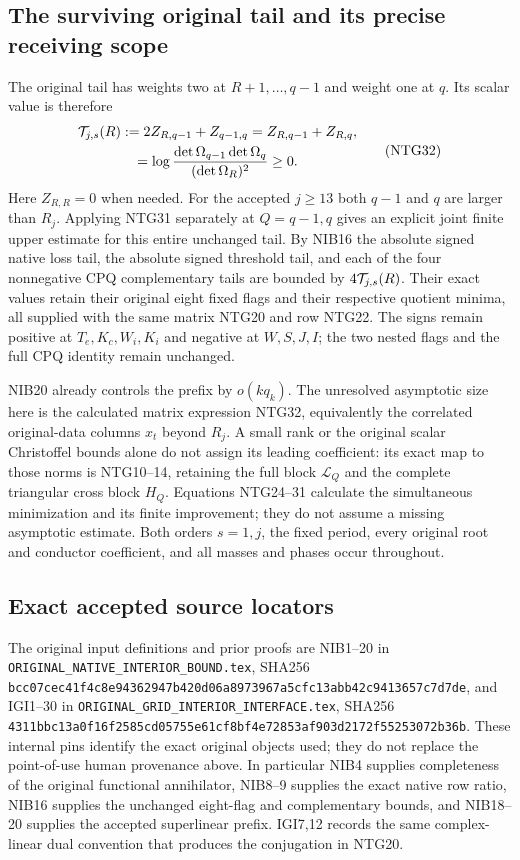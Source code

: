 \subsection{The surviving original tail and its precise receiving scope}
The original tail has weights two at $R+1,\ldots,q-1$
and weight one at $q$. Its scalar value is therefore
\[
\begin{gathered}
 {\cal T}_{j,s}(R)
   :=2Z_{R,q-1}+Z_{q-1,q}
    =Z_{R,q-1}+Z_{R,q},\\
 =\log\frac{\det\Omega_{q-1}\det\Omega_q}
                         {(\det\Omega_R)^2}\ge0 .
\end{gathered}                                                    \tag{NTG32}
\]
Here $Z_{R,R}=0$ when needed. For the accepted $j\ge13$
both $q-1$ and $q$ are larger than $R_j$.
Applying NTG31 separately at $Q=q-1,q$ gives an
explicit joint finite upper estimate for this entire
unchanged tail. By NIB16 the absolute signed native
loss tail, the absolute signed threshold tail, and
each of the four nonnegative CPQ complementary tails
are bounded by $4{\cal T}_{j,s}(R)$.
Their exact values retain their original eight fixed
flags and their respective quotient minima, all
supplied with the same matrix NTG20 and row NTG22.
The signs remain positive at $T_e,K_c,W_i,K_i$ and
negative at $W,S,J,I$; the two nested flags and
the full CPQ identity remain unchanged.

NIB20 already controls the prefix by $o(kq_k)$.
The unresolved asymptotic size here is the calculated
matrix expression NTG32, equivalently the correlated
original-data columns $x_t$ beyond $R_j$. A small rank
or the original scalar Christoffel bounds alone do
not assign its leading coefficient: its exact map
to those norms is NTG10--14, retaining the full block
$\mathcal L_Q$ and the complete triangular cross block $H_Q$.
Equations NTG24--31 calculate the simultaneous
minimization and its finite improvement; they do
not assume a missing asymptotic estimate. Both
orders $s=1,j$, the fixed period, every original
root and conductor coefficient, and all masses
and phases occur throughout.

\subsection{Exact accepted source locators}
The original input definitions and prior proofs are NIB1--20
in \texttt{ORIGINAL\_NATIVE\_INTERIOR\_BOUND.tex},
SHA256
\texttt{bcc07cec41f4c8e94362947b420d06a8973967a5cfc13abb42c9413657c7d7de},
and IGI1--30 in
\texttt{ORIGINAL\_GRID\_INTERIOR\_INTERFACE.tex}, SHA256
\texttt{4311bbc13a0f16f2585cd05755e61cf8bf4e72853af903d2172f55253072b36b}.
These internal pins identify the exact original objects used;
they do not replace the point-of-use human provenance above.
In particular NIB4 supplies completeness of the original
functional annihilator, NIB8--9 supplies the exact native
row ratio, NIB16 supplies the unchanged eight-flag and
complementary bounds, and NIB18--20 supplies the accepted
superlinear prefix. IGI7,12 records the same complex-linear
dual convention that produces the conjugation in NTG20.
\endgroup
